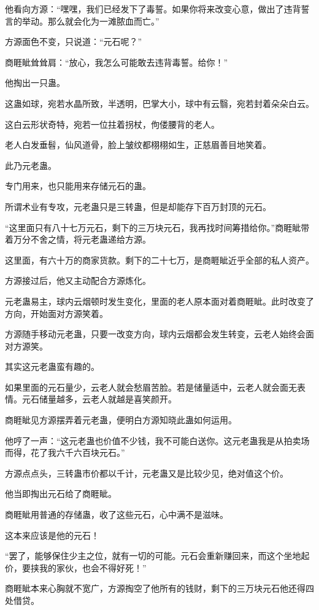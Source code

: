 \begin{this_body}
他看向方源：“嘿嘿，我们已经发下了毒誓。如果你将来改变心意，做出了违背誓言的举动。那么就会化为一滩脓血而亡。”

方源面色不变，只说道：“元石呢？”

商睚眦耸耸肩：“放心，我怎么可能敢去违背毒誓。给你！”

他掏出一只蛊。

这蛊如球，宛若水晶所致，半透明，巴掌大小，球中有云翳，宛若封着朵朵白云。

这白云形状奇特，宛若一位拄着拐杖，佝偻腰背的老人。

老人白发垂髫，仙风道骨，脸上皱纹都栩栩如生，正慈眉善目地笑着。

此乃元老蛊。

专门用来，也只能用来存储元石的蛊。

所谓术业有专攻，元老蛊只是三转蛊，但是却能存下百万封顶的元石。

“这里面只有八十七万元石，剩下的三万块元石，我再找时间筹措给你。”商睚眦带着万分不舍之情，将元老蛊递给方源。

这里面，有六十万的商家货款。剩下的二十七万，是商睚眦近乎全部的私人资产。

方源接过后，他又主动配合方源炼化。

元老蛊易主，球内云烟顿时发生变化，里面的老人原本面对着商睚眦。此时改变了方向，开始面对方源笑着。

方源随手移动元老蛊，只要一改变方向，球内云烟都会发生转变，云老人始终会面对方源笑。

其实这元老蛊蛮有趣的。

如果里面的元石量少，云老人就会愁眉苦脸。若是储量适中，云老人就会面无表情。元石储量越多，云老人就越是喜笑颜开。

商睚眦见方源摆弄着元老蛊，便明白方源知晓此蛊如何运用。

他哼了一声：“这元老蛊也价值不少钱，我不可能白送你。这元老蛊我是从拍卖场而得，花了我六千六百块元石。”

方源点点头，三转蛊市价都以千计，元老蛊又是比较少见，绝对值这个价。

他当即掏出元石给了商睚眦。

商睚眦用普通的存储蛊，收了这些元石，心中满不是滋味。

这本来应该是他的元石！

“罢了，能够保住少主之位，就有一切的可能。元石会重新赚回来，而这个坐地起价，要挟我的家伙，也会不得好死！”

商睚眦本来心胸就不宽广，方源掏空了他所有的钱财，剩下的三万块元石他还得四处借贷。


\end{this_body}
